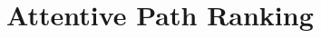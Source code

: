 \documentclass[letterpaper]{article} %
\begin{document}

\section{Attentive Path Ranking}
\end{document}
